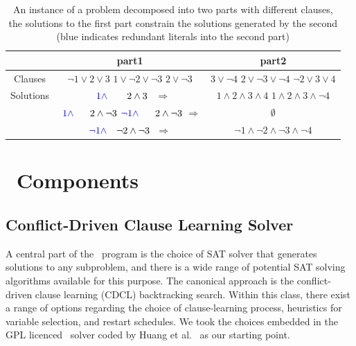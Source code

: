 \documentclass[
10pt, %
a4paper, %
oneside, %
headinclude,footinclude, %
BCOR5mm, %
]{scrartcl}
\begin{document}
\begin{table}[h!]
\centering

\begin{tabular}{c|c|c|}
\cline{2-3}
                          & part1 & part2 \\ \hline
\multicolumn{1}{|c|}{Clauses} &
\makecell{ $\neg 1 \lor 2 \lor 3 $ \\ $ 1 \lor \neg 2 \lor \neg 3 $ \\ $ 2 \lor \neg 3 $ }
       &
\makecell{ $ 3 \lor \neg 4 $ \\ $ 2 \lor \neg 3 \lor \neg 4 $ \\ $ \neg 2 \lor 3 \lor 4 $ }
       \\ \hline
Solutions                 &  $~~ \textcolor{blue}{1 \land}~~~~~~ 2 \land 3 $ $~~\Rightarrow$    &   
\makecell{ $ 1 \land 2 \land 3 \land 4 $ \\ $ 1 \land 2 \land 3 \land \neg 4 $ }    \\ \cline{3-3} 
                          &  \makecell{ $ ~\textcolor{blue}{1 \land}~~~~~ 2 \land \neg 3 $ \\ $ \textcolor{blue}{\neg 1 \land}~~~~~ 2 \land \neg 3 $  } $\Rightarrow$    &   $\emptyset$    \\ \cline{3-3} 
                          &  $\textcolor{blue}{\neg 1 \land}~~~ \neg 2 \land \neg 3 $  $~\Rightarrow$   &   $ \neg 1 \land \neg 2 \land \neg 3 \land \neg 4 $    \\ \cline{2-3} 
\end{tabular}
\caption[Solving CNF subproblems in sequence]{An instance of a problem decomposed into two parts with different clauses, the solutions to the first part constrain the solutions generated by the second (blue indicates redundant literals into the second part)}
\label{table2}
\end{table}







\pagebreak
\section{\dagster\  Components}\label{sec:dagster_components}

\subsection{Conflict-Driven Clause Learning Solver}\label{sec:CDCL_intro}

A central part of the \dagster\  program is the choice of SAT solver that generates solutions to any subproblem, and there is a wide range of potential SAT solving algorithms available for this purpose.
The canonical approach is the conflict-driven clause learning (CDCL) backtracking search. Within this class, there exist a range of options regarding the choice of clause-learning process, heuristics for variable selection, and restart schedules.
We took the choices embedded in the GPL licenced \tinisat\ solver coded by Huang et al.~\cite{DBLP:conf/ijcai/Huang07} as our starting point.
\end{document}
